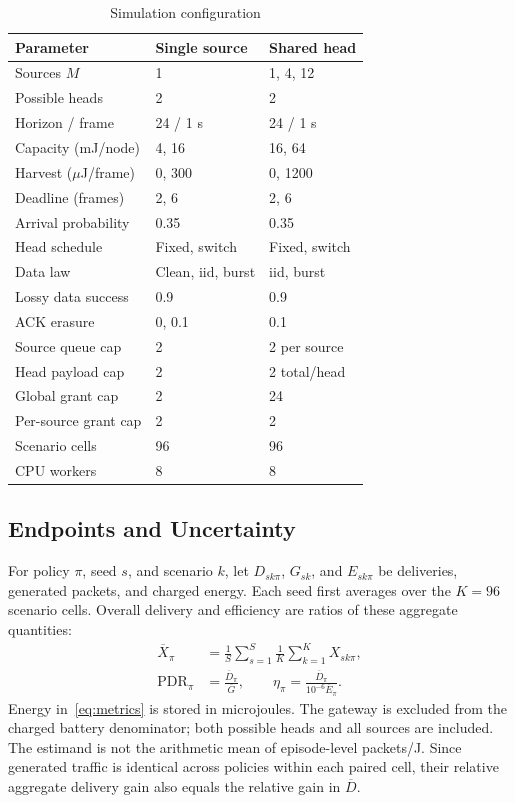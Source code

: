 \documentclass[journal,10pt]{IEEEtran}
\begin{document}
\begin{table}[t]
\caption{Simulation configuration}\label{tab:setup}\centering\small
\begin{tabular}{p{}p{}p{}}\toprule
Parameter & Single source & Shared head\\\midrule
Sources $M$ & 1 & 1, 4, 12\\
Possible heads & 2 & 2\\
Horizon / frame & 24 / 1 s & 24 / 1 s\\
Capacity (mJ/node) & 4, 16 & 16, 64\\
Harvest ($\mu$J/frame) & 0, 300 & 0, 1200\\
Deadline (frames) & 2, 6 & 2, 6\\
Arrival probability & 0.35 & 0.35\\
Head schedule & Fixed, switch & Fixed, switch\\
Data law & Clean, iid, burst & iid, burst\\
Lossy data success & 0.9 & 0.9\\
ACK erasure & 0, 0.1 & 0.1\\
Source queue cap & 2 & 2 per source\\
Head payload cap & 2 & 2 total/head\\
Global grant cap & 2 & 24\\
Per-source grant cap & 2 & 2\\
Scenario cells & 96 & 96\\
CPU workers & 8 & 8\\\bottomrule
\end{tabular}
\end{table}

\subsection{Endpoints and Uncertainty}
For policy $\pi$, seed $s$, and scenario $k$, let $D_{sk\pi}$, $G_{sk}$, and $E_{sk\pi}$ be deliveries, generated packets, and charged energy. Each seed first averages over the $K=96$ scenario cells. Overall delivery and efficiency are ratios of these aggregate quantities:
\begin{align}
\overline X_\pi&=\frac{1}{S}\sum_{s=1}^{S}\frac{1}{K}\sum_{k=1}^{K}X_{sk\pi},\\
\mathrm{PDR}_\pi&=\frac{\overline D_\pi}{\overline G},\qquad
\eta_\pi=\frac{\overline D_\pi}{10^{-6}\overline E_\pi}.
\label{eq:metrics}
\end{align}
Energy in~\eqref{eq:metrics} is stored in microjoules. The gateway is excluded from the charged battery denominator; both possible heads and all sources are included. The estimand is not the arithmetic mean of episode-level packets/J. Since generated traffic is identical across policies within each paired cell, their relative aggregate delivery gain also equals the relative gain in $\overline D$.
\end{document}
